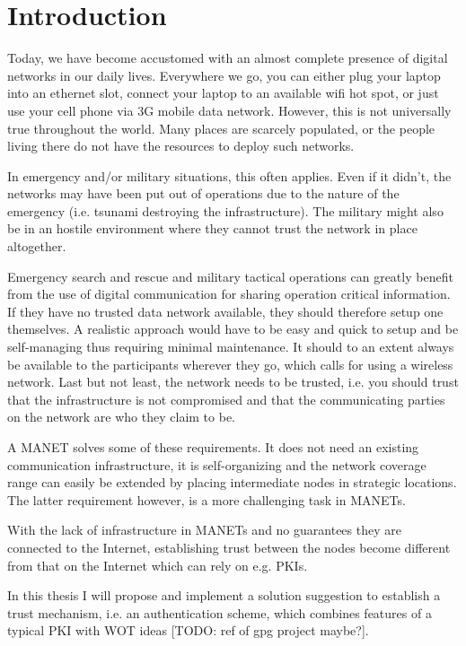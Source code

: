 \chapter{Introduction}
\label{ch:intro}
\acresetall

Today, we have become accustomed with an almost complete presence of digital
networks in our daily lives. Everywhere we go, you can either plug your laptop
into an ethernet slot, connect your laptop to an available wifi hot spot, or
just use your cell phone via 3G mobile data network. However, this is not
universally true throughout the world. Many places are scarcely populated, or
the people living there do not have the resources to deploy such networks.

In emergency and/or military situations, this often applies. Even if it didn't,
the networks may have been put out of operations due to the nature of the
emergency (i.e. tsunami destroying the infrastructure). The military might
also be in an hostile environment where they cannot trust the network in place
altogether.

Emergency search and rescue and military tactical operations can greatly benefit
from the use of digital communication for sharing operation critical
information. If they have no trusted data network available, they should
therefore setup one themselves. A realistic approach would have to be easy and
quick to setup and be self-managing thus requiring minimal maintenance. It
should to an extent always be available to the participants wherever they go,
which calls for using a wireless network. Last but not least, the network needs
to be trusted, i.e. you should trust that the infrastructure is not compromised
and that the communicating parties on the network are who they claim to be.

A \ac{MANET} solves some of these requirements. It does not need an existing
communication infrastructure, it is self-organizing and the network coverage
range can easily be extended by placing intermediate nodes in strategic
locations. The latter requirement however, is a more challenging task in
\acp{MANET}.

With the lack of infrastructure in \acp{MANET} and no guarantees they are
connected to the Internet, establishing trust between the nodes become different
from that on the Internet which can rely on e.g. \acp{PKI}.

In this thesis I will propose and implement a solution suggestion to establish a
trust mechanism, i.e. an authentication scheme, which combines features of a
typical \ac{PKI} with \ac{WOT} ideas [TODO: ref of gpg project maybe?].


